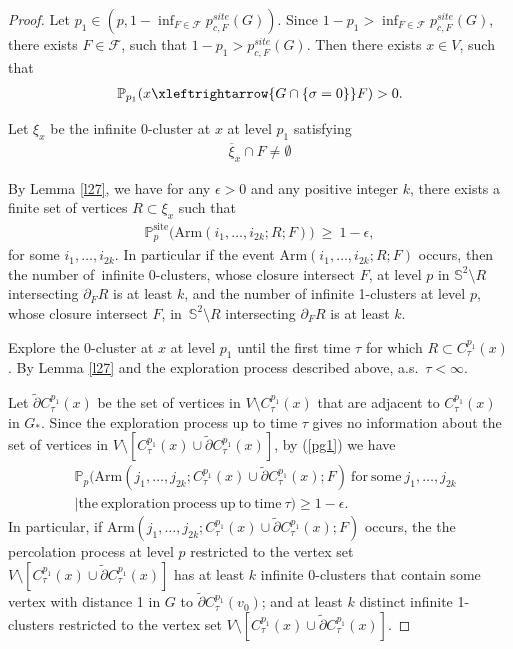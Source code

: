 \documentclass[11pt]{amsart}
\theoremstyle{plain}
\numberwithin{equation}{section}
\numberwithin{figure}{section}
\newcommand\ol{\overline}
\newcommand\PP{{\mathbb P}}
\newcommand\si{\sigma}
\newcommand\eps{\epsilon}
\begin{document}
\begin{proof}Let $p_1\in \left(p,1-\inf_{F\in\mathcal{F}} p_{c,F}^{site}(G)\right)$. 
Since $1-p_1>\inf_{F\in\mathcal{F}} p_{c,F}^{site}(G)$, there exists $F\in \mathcal{F}$, such that $1-p_1>p_{c,F}^{site}(G)$. Then there exists $x\in V$, such that
\begin{align*}
 \PP_{p_1}(x\xleftrightarrow{G\cap \{\si=0\}} F)>0.
\end{align*}

Let $\xi_x$ be the infinite 0-cluster at $x$ at level $p_1$ satisfying
\begin{align*}
\ol{\xi}_{x}\cap F\neq \emptyset 
\end{align*}

By Lemma \ref{l27}, we have for any $\epsilon>0$ and any positive integer $k$, there exists a finite set of vertices $R\subset \xi_{x}$ such that 
\begin{align}
\PP^{\mathrm{site}}_p\!\big(\mathrm{Arm}(i_1,\ldots,i_{2k};R;F)\big)\ \ge\ 1-\eps,\label{pg1}
\end{align}
for some $i_1,\ldots,i_{2k}$.
In particular if the event $\mathrm{Arm}(i_1,\ldots,i_{2k};R;F)$ occurs, then the number of\ infinite 0-clusters, whose closure intersect $F$, at level $p$ in 
$\mathbb{S}^2\setminus R$ intersecting $\partial_F R$ is at least $k$, and the number of infinite 1-clusters at level $p$, whose closure intersect $F$, in\ $\mathbb{S}^2\setminus R$ intersecting $\partial_F R$ is at least $k$.


Explore the 0-cluster at $x$ at level $p_1$ until the first time $\tau$ for which $R\subset C_{\tau}^{p_1}(x)$. By Lemma \ref{l27} and the exploration process described above, a.s.~$\tau<\infty$.


 Let $\tilde{\partial} C_{\tau}^{p_1}(x)$ be the set of vertices in $V\setminus C_{\tau}^{p_1}(x)$ that are adjacent to $C_{\tau}^{p_1}(x)$ in $G_*$. Since the exploration process up to time $\tau$ gives no information about the set of vertices in $V\setminus [C_{\tau}^{p_1}(x)\cup\tilde{\partial} C_{\tau}^{p_1}(x)]$, by (\ref{pg1}) we have
\begin{align*}
&\PP_p(\mathrm{Arm}(j_1,\ldots,j_{2k};C_{\tau}^{p_1}(x)\cup \tilde{\partial} C_{\tau}^{p_1}(x);F)\ \mathrm{for\ some}\ j_1,\ldots,j_{2k}\\
&|\mathrm{the\ exploration\ process\ up\ to\ time\ }\tau)\geq 1-\epsilon.
\end{align*}
 In particular, if $\mathrm{Arm}(j_1,\ldots,j_{2k};C_{\tau}^{p_1}(x)\cup \tilde{\partial} C_{\tau}^{p_1}(x);F)$ occurs, 
the the percolation process at level $p$ restricted to the vertex set $V\setminus [C_{\tau}^{p_1}(x)\cup \tilde{\partial} C_{\tau}^{p_1}(x)]$ has at least $k$ infinite 0-clusters that
 contain some vertex with distance 1 in $G$ to $\tilde{\partial} C_{\tau}^{p_1}(v_0)$; and at least $k$ distinct infinite 1-clusters restricted to the vertex set $V\setminus [C_{\tau}^{p_1}(x)\cup \tilde{\partial} C_{\tau}^{p_1}(x)]$.



\end{proof}
\end{document}
